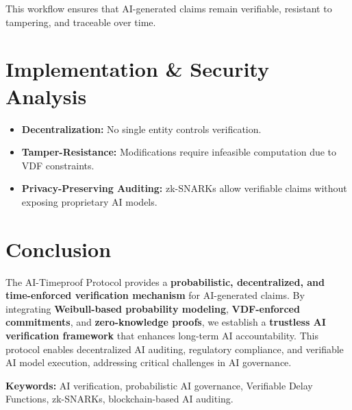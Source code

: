 \documentclass[12pt]{report}
\begin{document}
This workflow ensures that AI-generated claims remain verifiable, resistant to tampering, and traceable over time.

\section{Implementation \& Security Analysis}

\begin{itemize}
    \item \textbf{Decentralization:} No single entity controls verification.
    \item \textbf{Tamper-Resistance:} Modifications require infeasible computation due to VDF constraints.
    \item \textbf{Privacy-Preserving Auditing:} zk-SNARKs allow verifiable claims without exposing proprietary AI models.
\end{itemize}

\section{Conclusion}

The AI-Timeproof Protocol provides a \textbf{probabilistic, decentralized, and time-enforced verification mechanism} for AI-generated claims. By integrating \textbf{Weibull-based probability modeling}, \textbf{VDF-enforced commitments}, and \textbf{zero-knowledge proofs}, we establish a \textbf{trustless AI verification framework} that enhances long-term AI accountability. This protocol enables decentralized AI auditing, regulatory compliance, and verifiable AI model execution, addressing critical challenges in AI governance.

\bigskip
\noindent\textbf{Keywords:} AI verification, probabilistic AI governance, Verifiable Delay Functions, zk-SNARKs, blockchain-based AI auditing.



\end{document}

